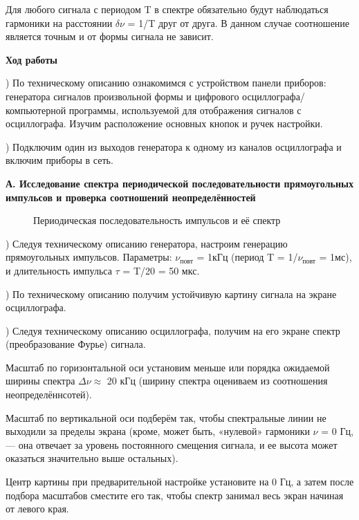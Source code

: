 \documentclass[a4paper,12pt]{article}
\begin{document}
Для любого сигнала с периодом T в спектре обязательно будут наблюдаться гармоники на расстоянии $\delta\nu$ = 1/T друг от друга. В данном случае соотношение является точным и от формы сигнала не зависит.

\textbf {Ход работы}

) По техническому описанию ознакомимся с устройством панели приборов: генератора сигналов произвольной формы и цифрового осциллографа/компьютерной программы, используемой для отображения сигналов с осциллографа. Изучим расположение основных кнопок и ручек настройки.

) Подключим один из выходов генератора к одному из каналов осциллографа и включим приборы в сеть.

\textbf {А. Исследование спектра периодической последовательности прямоугольных импульсов и проверка соотношений неопределённостей}

\begin{figure}
\caption{Периодическая последовательность импульсов и её спектр}
\end{figure}

) Следуя техническому описанию генератора, настроим генерацию прямоугольных импульсов. Параметры: $\nu_{\text{повт}}$ = 1кГц (период T = 1/$\nu_{\text{повт}}$ = 1мс), и длительность импульса $\tau$ = T/20 = 50 мкс.

) По техническому описанию получим устойчивую картину сигнала на экране осциллографа.

) Следуя техническому описанию осциллографа, получим на его экране спектр (преобразование Фурье) сигнала.

	Масштаб по горизонтальной оси установим меньше или порядка ожидаемой ширины спектра $\Delta\nu\approx$ 20 кГц  (ширину спектра оцениваем из соотношения неопределённсотей). 

	Масштаб по вертикальной оси подберём так, чтобы спектральные линии не выходили за пределы экрана (кроме, может быть, «нулевой» гармоники $\nu$ = 0 Гц, — она отвечает за уровень постоянного смещения сигнала, и ее высота может оказаться значительно выше остальных).
	
	Центр картины при предварительной настройке установите на 0 Гц, а затем после подбора масштабов сместите его так, чтобы спектр занимал весь экран начиная от левого края.
\end{document}
